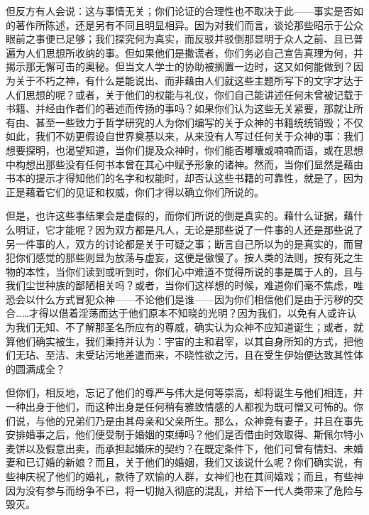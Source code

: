 但反方有人会说：这与事情无关；你们论证的合理性也不取决于此——事实是否如的著作所陈述，还是另有不同且明显相异。因为对我们而言，谈论那些昭示于公众眼前之事便已足够；我们探究何为真实，而反驳并驳倒那显明于众人之前、且已普遍为人们思想所收纳的事。但如果他们是撒谎者，你们务必自己宣告真理为何，并揭示那无懈可击的奥秘。但当文人学士的协助被搁置一边时，这又如何能做到？因为关于不朽之神，有什么是能说出、而非藉由人们就这些主题所写下的文字才达于人们思想的呢？或者，关于他们的权能与礼仪，你们自己能讲述任何未曾被记载于书籍、并经由作者们的著述而传扬的事吗？如果你们认为这些无关紧要，那就让所有由、甚至一些致力于哲学研究的人为你们编写的关于众神的书籍统统销毁；不仅如此，我们不妨更假设自世界奠基以来，从来没有人写过任何关于众神的事：我们想要探明，也渴望知道，当你们提及众神时，你们能否嘟囔或喃喃而语，或在思想中构想出那些没有任何书本曾在其心中赋予形象的诸神。然而，当你们显然是藉由书本的提示才得知他们的名字和权能时，却否认这些书籍的可靠性，就是了，因为正是藉着它们的见证和权威，你们才得以确立你们所说的。\par

但是，也许这些事结果会是虚假的，而你们所说的倒是真实的。藉什么证据，藉什么明证，它才能呢？因为双方都是凡人，无论是那些说了一件事的人还是那些说了另一件事的人，双方的讨论都是关于可疑之事；断言自己所以为的是真实的，而冒犯你们感觉的那些则显为放荡与虚妄，这便是傲慢了。按人类的法则，按有死之生物的本性，当你们读到或听到时，你们心中难道不觉得所说的事是属于人的，且与我们尘世种族的鄙陋相关吗？或者，当你们这样想的时候，难道你们毫不焦虑，唯恐会以什么方式冒犯众神——不论他们是谁——因为你们相信他们是由于污秽的交合……才得以借着淫荡而达于他们原本不知晓的光明？因为我们，以免有人或许认为我们无知、不了解那圣名所应有的尊威，确实认为众神不应知道诞生；或者，就算他们确实被生，我们秉持并认为：宇宙的主和君宰，以其自身所知的方式，把他们无玷、至洁、未受玷污地差遣而来，不晓性欲之污，且在受生伊始便达致其性体的圆满成全？\par

但你们，相反地，忘记了他们的尊严与伟大是何等崇高，却将诞生与他们相连，并一种出身于他们，而这种出身是任何稍有雅致情感的人都视为既可憎又可怖的。你们说，与他的兄弟们乃是由其母亲和父亲所生。那么，众神竟有妻子，并且在事先安排婚事之后，他们便受制于婚姻的束缚吗？他们是否借由时效取得、斯佩尔特小麦饼以及假意出卖，而承担起婚床的契约？在既定条件下，他们可曾有情妇、未婚妻和已订婚的新娘？而且，关于他们的婚姻，我们又该说什么呢？你们确实说，有些神庆祝了他们的婚礼，款待了欢愉的人群，女神们也在其间嬉戏；而且，有些神因为没有参与而纷争不已，将一切抛入彻底的混乱，并给下一代人类带来了危险与毁灭。\par

